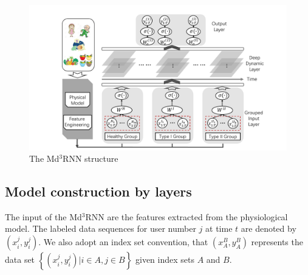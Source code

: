 \begin{figure}[!t]
  \centering
  \includegraphics[width=0.9\columnwidth]{./img/pics_RNN.pdf}
  \caption{The Md$^3$RNN structure}
  \label{fig:rnn}
\end{figure}

\subsection{Model construction by layers}
The input of the Md$^3$RNN are the features extracted from the physiological model. The labeled data sequences for user number $j$ at time $t$ are denoted by $(x_i^{j},y_i^{j})$. We also adopt an index set convention, that $(x_A^{B},y_A^B)$ represents the data set $\left\{(x_i^{j},y_i^{j}) | i \in A, j\in B\right\}$ given index sets $A$ and $B$.
